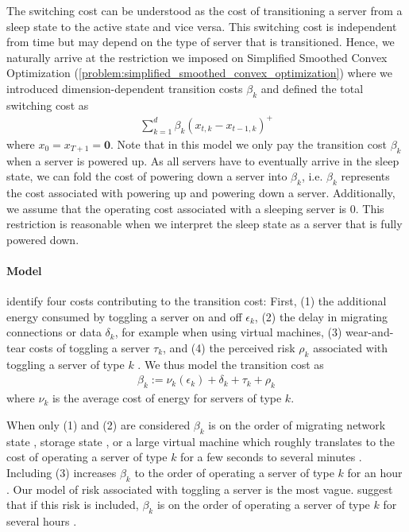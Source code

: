 The switching cost can be understood as the cost of transitioning a server from a sleep state to the active state and vice versa. This switching cost is independent from time but may depend on the type of server that is transitioned. Hence, we naturally arrive at the restriction we imposed on Simplified Smoothed Convex Optimization (\autoref{problem:simplified_smoothed_convex_optimization}) where we introduced dimension-dependent transition costs $\beta_k$ and defined the total switching cost as \begin{align*}
    \sum_{k=1}^d \beta_k (x_{t,k} - x_{t-1,k})^+
\end{align*} where $x_0 = x_{T+1} = \mathbf{0}$. Note that in this model we only pay the transition cost $\beta_k$ when a server is powered up. As all servers have to eventually arrive in the sleep state, we can fold the cost of powering down a server into $\beta_k$, i.e. $\beta_k$ represents the cost associated with powering up and powering down a server. Additionally, we assume that the operating cost associated with a sleeping server is $0$. This restriction is reasonable when we interpret the sleep state as a server that is fully powered down.

\paragraph{Model} \citeauthor*{Lin2011} identify four costs contributing to the transition cost: First, (1) the additional energy consumed by toggling a server on and off $\epsilon_k$, (2) the delay in migrating connections or data $\delta_k$, for example when using virtual machines, (3) wear-and-tear costs of toggling a server $\tau_k$, and (4) the perceived risk $\rho_k$ associated with toggling a server of type $k$ \cite{Lin2011}. We thus model the transition cost as \begin{align*}
    \beta_k := \nu_k(\epsilon_k) + \delta_k + \tau_k + \rho_k
\end{align*} where $\nu_k$ is the average cost of energy for servers of type $k$.

When only (1) and (2) are considered $\beta_k$ is on the order of migrating network state \cite{Chen2008}, storage state \cite{Thereska2009}, or a large virtual machine \cite{Clark2005} which roughly translates to the cost of operating a server of type $k$ for a few seconds to several minutes \cite{Lin2011}. Including (3) increases $\beta_k$ to the order of operating a server of type $k$ for an hour \cite{Bodik2008}. Our model of risk associated with toggling a server is the most vague. \citeauthor*{Lin2011} suggest that if this risk is included, $\beta_k$ is on the order of operating a server of type $k$ for several hours \cite{Lin2011}.

